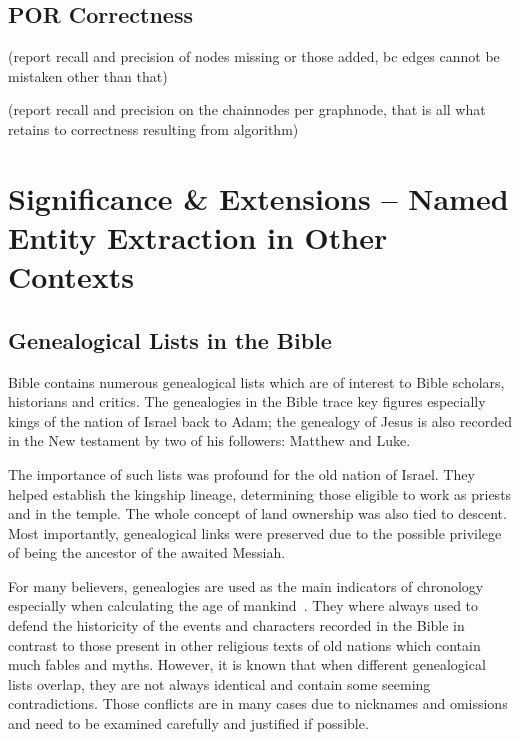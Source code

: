 \documentclass[11pt]{article}
\begin{document}
\subsection{POR Correctness}

(report recall and precision of nodes missing or those added, bc edges cannot be mistaken other than that)

(report recall and precision on the chainnodes per graphnode, that is all what retains to correctness resulting from algorithm)

\section{Significance \& Extensions -- Named Entity Extraction in Other Contexts}

\subsection{Genealogical Lists in the Bible}

Bible contains numerous genealogical lists which are of interest to Bible scholars, historians and critics. 
The genealogies in the Bible trace key figures especially kings of the nation of Israel back to Adam; 
the genealogy of Jesus is also recorded in the New testament by two of his followers: Matthew and Luke. 


The importance of such lists was profound for the old nation of Israel. They helped establish the kingship lineage, determining 
those eligible to work as priests and in the temple. The whole concept of land ownership was also tied to descent. Most importantly,
genealogical links were preserved due to the possible privilege of being the ancestor of the awaited Messiah.~\cite{catholicEncyclopedia:Online}

For many believers, genealogies are used as the main indicators of chronology especially when calculating the age of mankind~\cite{Thomas:92}.
They where always used to defend the historicity of the events and characters recorded in the Bible in contrast to those present in other religious 
texts of old nations which contain much fables and myths. However, it is known that when different genealogical lists overlap, they are
not always identical and contain some seeming contradictions. Those conflicts are in many cases due to nicknames and omissions and need to be examined
carefully and justified if possible.
\end{document}
